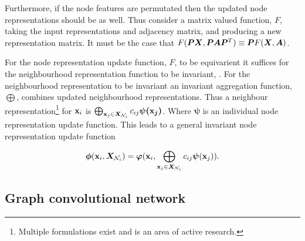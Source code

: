 Furthermore, if the node features are permutated then the updated node representations should be as well.
Thus consider a matrix valued function, $F$, taking the input representations and adjacency matrix, and producing a new representation matrix.
It must be the case that $F({\bm{P}}{\bm{X}}, {\bm{P}}{\bm{A}}{\bm{P}}^T) \equiv {\bm{P}} F({\bm{X}}, {\bm{A}})$.

For the node representation update function, $F$, to be equivarient it suffices for the neighbourhood representation function to be invariant, .
For the neighbourhood representation to be invariant an invariant aggregation function, $\bigoplus$, combines updated neighbourhood representations.
Thus a neighbour representation\footnote{Multiple formulations exist and is an area of active research.} for ${\textbf{x}}_i$ is $\bigoplus_{{\textbf{x}}_j \in {\bm{X}}_{{\mathcal{N}}_i}}c_{ij}\bm{\psi({\textbf{x}}_j)}$.
Where $\bm{\psi}$ is an individual node representation update function.
This leads to a general invariant node representation update function

\begin{equation}
    \label{eq:conv-def}
    \bm{\phi}({\textbf{x}}_i, {\bm{X}}_{{\mathcal{N}}_i}) = \bm{\varphi}({\textbf{x}}_i, \bigoplus_{{\textbf{x}}_j \in {\bm{X}}_{{\mathcal{N}}_i}}c_{ij}\bm{\psi}({\textbf{x}}_j)).
\end{equation}








\subsection{Graph convolutional network}
\label{sec:GCN}

